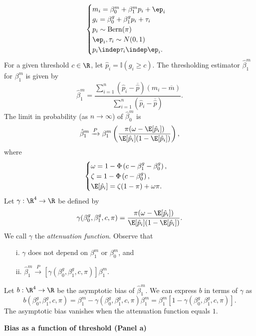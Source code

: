 \documentclass[12pt]{article}
\begin{document}
\begin{equation}\label{theoretical_model}
\begin{cases}
m_i = \beta^m_0 + \beta^m_1 p_i + \ep_i \\
g_i = \beta^g_0 + \beta^g_1 p_i + \tau_i \\
p_i \sim \textrm{Bern}(\pi) \\
\ep_i, \tau_i \sim N(0,1) \\
p_i \indep \tau_i \indep \ep_i.
\end{cases}
\end{equation}
For a given threshold $c \in \R$, let $\hat{p}_i = \mathbb{I}(g_i \geq c).$ The thresholding estimator $\hat{\beta}^m_1$ for $\beta^m_1$ is given by $$\hat{\beta}^m_1 = \frac{\sum_{i=1}^n (\hat{p}_i - \overline{\hat{p}}) (m_i - \overline{m})}{\sum_{i=1}^n (\hat{p}_i - \overline{\hat{p}})}.$$ The limit in probability (as $n \to \infty$) of $\hat{\beta}^m_0$ is
\begin{equation}\label{thresh_est_intercepts}
\hat{\beta}^m_1 \xrightarrow{P} \beta^m_1 \left(\frac{ \pi( \omega - \E[ \hat{p}_i ])}{ \E[\hat{p}_i] (1 - \E[\hat{p}_i])}\right),
\end{equation}
where
$$\begin{cases}
\omega = 1 - \Phi\left(c - \beta_1^g - \beta_0^g \right) ,\\ \zeta = 1 - \Phi\left( c - \beta^g_0 \right), \\ \E[\hat{p}_i] = \zeta(1-\pi) + \omega\pi. 
\end{cases}$$
Let $\gamma: \R^4 \to \R$ be defined by
$$ \gamma( \beta^g_0, \beta^g_1, c, \pi ) = \frac{\pi (\omega - \E[\hat{p}_i])}{\E[\hat{p}_i] (1 - \E[\hat{p}_i]) }.$$ We call $\gamma$ the \textit{attenuation function}. Observe that \begin{itemize}
\item[i.] $\gamma$ does not depend on $\beta^m_1$ or $\beta^m_0$, and
\item[ii.] $\hat{\beta}^m_1 \xrightarrow{P} [\gamma(\beta_0^g, \beta_1^g, c, \pi)] \beta^m_1.$
\end{itemize}
Let $b: \R^4 \to \R$ be the asymptotic bias of $\hat{\beta}^m_1$. We can express $b$ in terms of $\gamma$ as $$b\left(\beta^g_0, \beta^g_1, c, \pi \right) = \beta^m_1 - \gamma( \beta_0^g, \beta_1^g, c, \pi) \beta^m_1 = \beta^m_1 \left[ 1- \gamma(\beta^g_0, \beta^g_1, c, \pi) \right].$$ The asymptotic bias vanishes when the attenuation function equals $1$.

\begin{center}
\textbf{Bias as a function of threshold (Panel a)}
\end{center}
\end{document}
